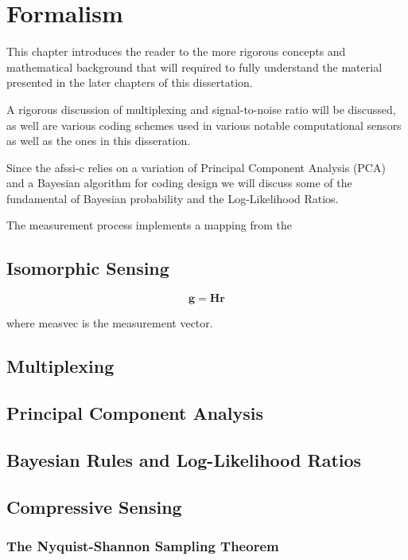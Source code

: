 \chapter{Formalism}\label{chap:Formalism}

This chapter introduces the reader to the more rigorous concepts and mathematical background that will required to fully understand the material presented in the later chapters of this dissertation. 

A rigorous discussion of multiplexing and signal-to-noise ratio will be discussed, as well are various coding schemes used in various notable computational sensors as well as the ones in this disseration. 

Since the \gls{afssi-c} relies on a variation of Principal Component Analysis (PCA) and a Bayesian algorithm for coding design we will discuss some of the fundamental of Bayesian probability and the Log-Likelihood Ratios. 

The measurement process implements a mapping from the 


\section{Isomorphic Sensing}

\begin{equation}
\mathbf{g} = \mathbf{Hr}
\end{equation}

where \gls{measvec} is the measurement vector.

\section{Multiplexing}

\section{Principal Component Analysis}

\section{Bayesian Rules and Log-Likelihood Ratios}

\section{Compressive Sensing}



\subsection{The Nyquist-Shannon Sampling Theorem}

